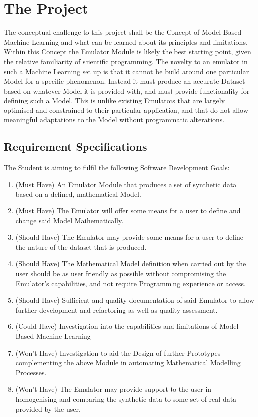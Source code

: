\documentclass{article}
\begin{document}
  

\section{The Project}

The conceptual challenge to this project shall be the Concept of Model Based Machine Learning and what can be learned about its principles and limitations.
\\ Within this Concept the Emulator Module is likely the best starting point, given the relative familiarity of scientific programming. The novelty to an emulator in such a Machine Learning set up is that it cannot be build around one particular Model for a specific phenomenon. Instead it must produce an accurate Dataset based on whatever Model it is provided with, and must provide functionality for defining such a Model. This is unlike existing Emulators that are largely optimised and constrained to their particular application, and that do not allow meaningful adaptations to the Model without programmatic alterations.

  \subsection{Requirement Specifications}
  
The Student is aiming to fulfil the following Software Development Goals:

    \begin{enumerate}
      \item (Must Have) An Emulator Module that produces a set of synthetic data based on a defined, mathematical Model.
      \item (Must Have) The Emulator will offer some means for a user to define and change said Model Mathematically.
      \item (Should Have) The Emulator may provide some means for a user to define the nature of the dataset that is produced.
      \item (Should Have) The Mathematical Model definition when carried out by the user should be as user friendly as possible without compromising the Emulator's capabilities, and not require Programming experience or access.
      \item (Should Have) Sufficient and quality documentation of said Emulator to allow further development and refactoring as well as quality-assessment.
      \item (Could Have) Investigation into the capabilities and limitations of Model Based Machine Learning
      \item (Won't Have) Investigation to aid the Design of further Prototypes complementing the above Module in automating Mathematical Modelling Processes.
      \item (Won't Have) The Emulator may provide support to the user in homogenising and comparing the synthetic data to some set of real data provided by the user.
    \end{enumerate}
\end{document}
